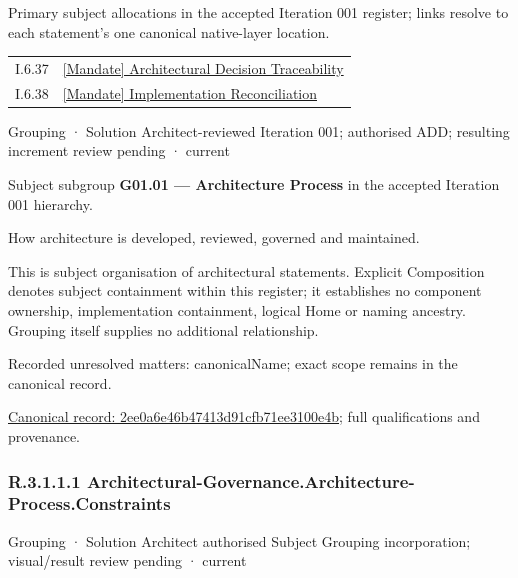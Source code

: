 Primary subject allocations in the accepted Iteration 001 register; links resolve to each statement’s one canonical native-layer location.\par
\begin{longtable}{p{.22\linewidth}p{.73\linewidth}}
I.6.37 & \hyperref[element:ae28fe841f6b476da4393c5e3c6a2eab]{[Mandate] Architectural Decision Traceability} \\
I.6.38 & \hyperref[element:5acccfa8cf634669a26bb31010926720]{[Mandate] Implementation Reconciliation} \\
\end{longtable}
\label{element:2ee0a6e46b47413d91cfb71ee3100e4b}
{\small Grouping · Solution Architect-reviewed Iteration 001; authorised ADD; resulting increment review pending · current}\par

Subject subgroup \textbf{G01.01 — Architecture Process} in the accepted Iteration 001 hierarchy.



How architecture is developed, reviewed, governed and maintained.



This is subject organisation of architectural statements. Explicit Composition denotes subject containment within this register; it establishes no component ownership, implementation containment, logical Home or naming ancestry. Grouping itself supplies no additional relationship.


{\small Recorded unresolved matters: canonicalName; exact scope remains in the canonical record.}\par
{\footnotesize \href{../../../../continuum/grouping/2ee0a6e46b47413d91cfb71ee3100e4b.md}{Canonical record: 2ee0a6e46b47413d91cfb71ee3100e4b}; full qualifications and provenance.}\par
\subsubsection*{R.3.1.1.1 Architectural-Governance.Architecture-Process.Constraints}
\label{navigation:R.3.1.1.1}

\label{element:6fceb4d8857a4601b736a33e9bec140a}
{\small Grouping · Solution Architect authorised Subject Grouping incorporation; visual/result review pending · current}\par

